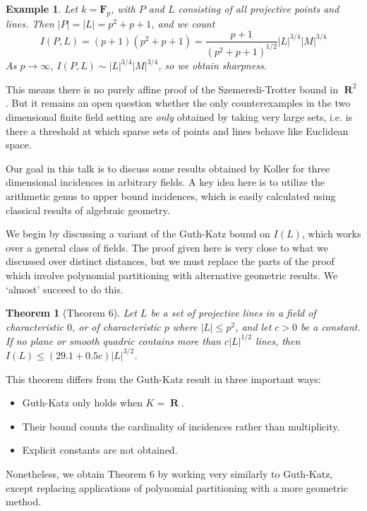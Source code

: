 \documentclass{article}
\theoremstyle{plain}
\newtheorem{theorem}{Theorem}
\newtheorem*{example}{Example}
\DeclareMathOperator{\RR}{\mathbf{R}}
\begin{document}
\begin{example}
    Let $k = \mathbf{F}_p$, with $P$ and $L$ consisting of all projective points and lines. Then $|P| = |L| = p^2 + p+1$, and we count
    \[ I(P,L) = (p+1)(p^2+p+1) = \frac{p+1}{(p^2 + p + 1)^{1/2}} |L|^{3/4} |M|^{3/4} \]
    As $p \to \infty$, $I(P,L) \sim |L|^{3/4} |M|^{3/4}$, so we obtain sharpness.
\end{example}

This means there is no purely affine proof of the Szemeredi-Trotter bound in $\RR^2$. But it remains an open question whether the only counterexamples in the two dimensional finite field setting are {\it only} obtained by taking very large sets, i.e. is there a threshold at which sparse sets of points and lines behave like Euclidean space.

Our goal in this talk is to discuss some results obtained by Koller for three dimensional incidences in arbitrary fields. A key idea here is to utilize the arithmetic genus to upper bound incidences, which is easily calculated using classical results of algebraic geometry.

We begin by discussing a variant of the Guth-Katz bound on $I(L)$, which works over a general class of fields. The proof given here is very close to what we discussed over distinct distances, but we must replace the parts of the proof which involve polynomial partitioning with alternative geometric results. We `almost' succeed to do this.

\begin{theorem}[Theorem 6]
    Let $L$ be a set of projective lines in a field of characteristic $0$, or of characteristic $p$ where $|L| \leq p^2$, and let $c > 0$ be a constant. If no plane or smooth quadric contains more than $c |L|^{1/2}$ lines, then $I(L) \leq (29.1 + 0.5c) |L|^{3/2}$.
\end{theorem}

This theorem differs from the Guth-Katz result in three important ways:
%
\begin{itemize}
    \item Guth-Katz only holds when $K = \RR$.
    \item Their bound counts the cardinality of incidences rather than multiplicity.
    \item Explicit constants are not obtained.
\end{itemize}
%
Nonetheless, we obtain Theorem 6 by working very similarly to Guth-Katz, except replacing applications of polynomial partitioning with a more geometric method.
\end{document}
